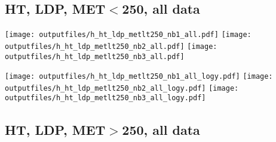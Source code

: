 \documentclass[11pt]{article}
\begin{document}






    \subsection{ HT, LDP, MET$<$250, all data}

    \noindent
     \texttt{[image: outputfiles/h\_ht\_ldp\_metlt250\_nb1\_all.pdf]}
     \texttt{[image: outputfiles/h\_ht\_ldp\_metlt250\_nb2\_all.pdf]}
     \texttt{[image: outputfiles/h\_ht\_ldp\_metlt250\_nb3\_all.pdf]}

    \noindent
     \texttt{[image: outputfiles/h\_ht\_ldp\_metlt250\_nb1\_all\_logy.pdf]}
     \texttt{[image: outputfiles/h\_ht\_ldp\_metlt250\_nb2\_all\_logy.pdf]}
     \texttt{[image: outputfiles/h\_ht\_ldp\_metlt250\_nb3\_all\_logy.pdf]}


    \subsection{ HT, LDP, MET$>$250, all data}
\end{document}
